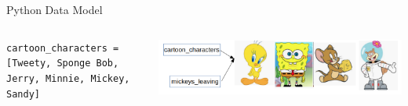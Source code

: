     \begin{frame}{Python Data Model}
       \begin{columns}
            \begin{column}[c]{0.5\textwidth}
                \texttt{cartoon\_characters = [\textquotesingle Tweety\textquotesingle , \textquotesingle Sponge Bob\textquotesingle , \textquotesingle Jerry\textquotesingle , \textquotesingle Minnie\textquotesingle , \textquotesingle Mickey\textquotesingle , \textquotesingle Sandy\textquotesingle ]}                \\
            \end{column}
            \begin{column}[c]{0.5\textwidth}
                \includegraphics[width=\textwidth]{images/list_cartoons/pointer.png}
                           

\end{column}
\end{columns}
\end{frame}
